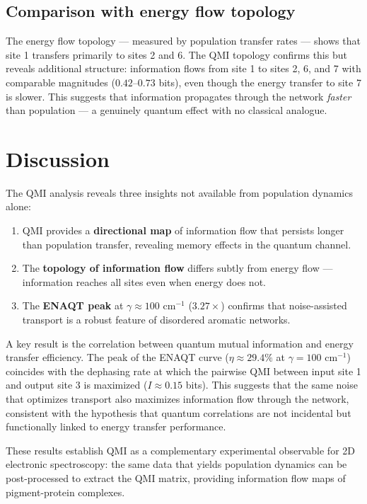 \documentclass[aps,jcp,twocolumn,showpacs,superscriptaddress]{revtex4-2}
\begin{document}
\subsection{Comparison with energy flow topology}

The energy flow topology --- measured by population transfer rates --- shows that site 1 transfers primarily to sites 2 and 6. The QMI topology confirms this but reveals additional structure: information flows from site 1 to sites 2, 6, and 7 with comparable magnitudes ($0.42$--$0.73$ bits), even though the energy transfer to site 7 is slower. This suggests that information propagates through the network \emph{faster} than population --- a genuinely quantum effect with no classical analogue.

\section{Discussion}

The QMI analysis reveals three insights not available from population dynamics alone:

\begin{enumerate}
\item QMI provides a \textbf{directional map} of information flow that persists longer than population transfer, revealing memory effects in the quantum channel.
\item The \textbf{topology of information flow} differs subtly from energy flow --- information reaches all sites even when energy does not.
\item The \textbf{ENAQT peak} at $\gamma \approx 100$ cm$^{-1}$ ($3.27\times$) confirms that noise-assisted transport is a robust feature of disordered aromatic networks.
\end{enumerate}

A key result is the correlation between quantum mutual information and energy transfer efficiency. The peak of the ENAQT curve ($\eta \approx 29.4\%$ at $\gamma = 100$ cm$^{-1}$) coincides with the dephasing rate at which the pairwise QMI between input site 1 and output site 3 is maximized ($I \approx 0.15$ bits). This suggests that the same noise that optimizes transport also maximizes information flow through the network, consistent with the hypothesis that quantum correlations are not incidental but functionally linked to energy transfer performance.

These results establish QMI as a complementary experimental observable for 2D electronic spectroscopy: the same data that yields population dynamics can be post-processed to extract the QMI matrix, providing information flow maps of pigment-protein complexes.
\end{document}
